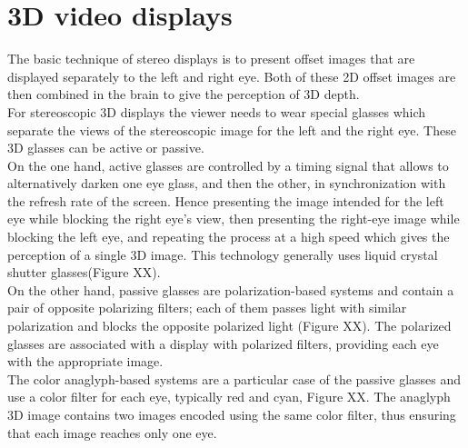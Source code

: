 \section{3D video displays}
The basic technique of stereo displays is to present offset images that are displayed separately to the left and right eye. Both of these 2D offset images are then combined in the brain to give the perception of 3D depth.\\
For stereoscopic 3D displays the viewer needs to wear special glasses which separate the views of the stereoscopic image for the left and the right eye. These 3D glasses can be active or passive.\\
On the one hand, active glasses are controlled by a timing signal that allows to alternatively darken one
eye glass, and then the other, in synchronization with the refresh rate of the screen. Hence presenting
the image intended for the left eye while blocking the right eye's view, then presenting the right-eye
image while blocking the left eye, and repeating the process at a high speed which gives the perception
of a single 3D image. This technology generally uses liquid crystal shutter glasses(Figure XX).\\
On the other hand, passive glasses are polarization-based systems and contain a pair of opposite polarizing filters; each of them passes light with similar polarization and blocks the opposite polarized light (Figure XX). The polarized glasses are associated with a display with polarized filters, providing each eye with the appropriate image.\\
The color anaglyph-based systems are a particular case of the passive glasses and use a color filter for
each eye, typically red and cyan, Figure XX. The anaglyph 3D image contains two images encoded using the same color filter, thus ensuring that each image reaches only one eye.
